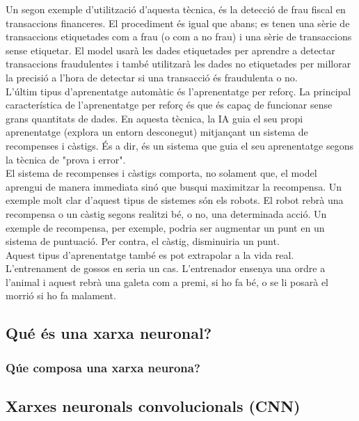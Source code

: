 \documentclass[a4paper,12pt]{article}
\begin{document}
Un segon exemple d'utilització d'aquesta tècnica, és la detecció de frau fiscal en transaccions financeres. El procediment és igual que abans; es tenen una sèrie de transaccions etiquetades com a frau (o com a no frau) i una sèrie de transaccions sense etiquetar. El model usarà les dades etiquetades per aprendre a detectar transaccions fraudulentes i també utilitzarà les dades no etiquetades per millorar la precisió a l'hora de detectar si una transacció és fraudulenta o no.\\
L'últim tipus d'aprenentatge automàtic és l'aprenentatge per reforç. La principal característica de l'aprenentatge per reforç és que és capaç de funcionar sense grans quantitats de dades. En aquesta tècnica, la IA guia el seu propi aprenentatge (explora un entorn desconegut) mitjançant un sistema de recompenses i càstigs. És a dir, és un sistema que guia el seu aprenentatge segons la tècnica de "prova i error".\\
El sistema de recompenses i càstigs comporta, no solament que, el model aprengui de manera immediata sinó que busqui maximitzar la recompensa.
Un exemple molt clar d'aquest tipus de sistemes són els robots. El robot rebrà una recompensa o un càstig segons realitzi bé, o no, una determinada acció. Un exemple de recompensa, per exemple, podria ser augmentar un punt en un sistema de puntuació. Per contra, el càstig, disminuiria un punt.\\
Aquest tipus d'aprenentatge també es pot extrapolar a la vida real. L'entrenament de gossos en seria un cas. L'entrenador ensenya una ordre a l'animal i aquest rebrà una galeta com a premi, si ho fa bé, o se li posarà el morrió si ho fa malament.
\subsection*{Qué és una xarxa neuronal?}

\subsubsection*{Qúe composa una xarxa neurona?}

\subsection*{Xarxes neuronals convolucionals (CNN)}
\end{document}

